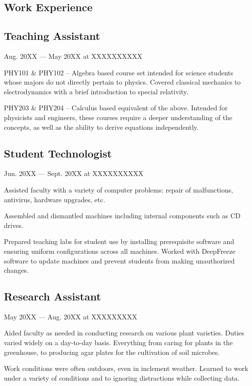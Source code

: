 \documentclass[letterpaper]{easyCV}
\begin{document}
\begin{main}[10pt]
\section{Work Experience}

\subsection{Teaching Assistant}{Aug. 20XX --- May 20XX at XXXXXXXXXX}
\begin{mainlist}
\item PHY101 \& PHY102 -- Algebra based course set intended for science students whose majors do not directly pertain to physics.  Covered classical mechanics to electrodynamics with a brief introduction to special relativity.
\item PHY203 \& PHY204 -- Calculus based equivalent of the above.  Intended for physicists and engineers, these courses require a deeper understanding of the concepts, as well as the ability to derive equations independently.
\end{mainlist}

\subsection{Student Technologist}{Jun. 20XX --- Sept. 20XX at XXXXXXXXXX}
\begin{mainlist}
\item Assisted faculty with a variety of computer problems: repair of malfunctions, antivirus, hardware upgrades, etc. 
\item Assembled and dismantled machines including internal components such as CD drives.
\item Prepared teaching labs for student use by installing prerequisite software and ensuring uniform configurations across all machines.  Worked with DeepFreeze software to update machines and prevent students from making unauthorized changes.
\end{mainlist}

\subsection{Research Assistant}{May 20XX --- Aug. 20XX at XXXXXXXXX}
\begin{mainlist}
\item Aided faculty as needed in conducting research on various plant varieties.  Duties varied widely on a day-to-day basis.  Everything from caring for plants in the greenhouse, to producing agar plates for the cultivation of soil microbes.
\item Work conditions were often outdoors, even in inclement weather.  Learned to work under a variety of conditions and to ignoring distractions while collecting data.
\end{mainlist}


\end{main}
\end{document}
